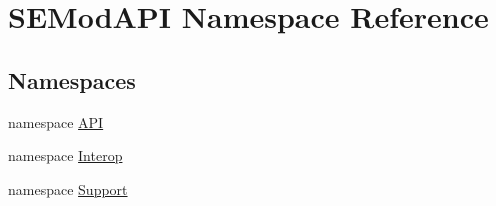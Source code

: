 \hypertarget{namespace_s_e_mod_a_p_i}{}\section{S\+E\+Mod\+A\+P\+I Namespace Reference}
\label{namespace_s_e_mod_a_p_i}
\subsection*{Namespaces}
\begin{DoxyCompactItemize}
\item 
namespace \hyperlink{namespace_s_e_mod_a_p_i_1_1_a_p_i}{A\+P\+I}
\item 
namespace \hyperlink{namespace_s_e_mod_a_p_i_1_1_interop}{Interop}
\item 
namespace \hyperlink{namespace_s_e_mod_a_p_i_1_1_support}{Support}
\end{DoxyCompactItemize}
